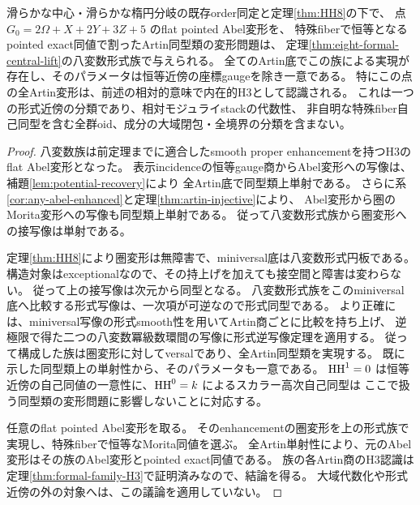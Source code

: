 \begin{theorem}\label{thm:intrinsic-formal-eight}
滑らかな中心・滑らかな楕円分岐の既存order同定と定理\ref{thm:HH8}の下で、
点 $G_0=2\Omega+X+2Y+3Z+5$ のflat pointed Abel変形を、
特殊fiberで恒等となるpointed exact同値で割ったArtin同型類の変形問題は、
定理\ref{thm:eight-formal-central-lift}の八変数形式族で与えられる。
全てのArtin底でこの族による実現が存在し、そのパラメータは恒等近傍の座標gaugeを除き一意である。
特にこの点の全Artin変形は、前述の相対的意味で内在的H3として認識される。
これは一つの形式近傍の分類であり、相対モジュライstackの代数性、
非自明な特殊fiber自己同型を含む全群oid、成分の大域閉包・全境界の分類を含まない。
\end{theorem}
\begin{proof}
八変数族は前定理までに適合したsmooth proper enhancementを持つH3のflat Abel変形となった。
表示incidenceの恒等gauge商からAbel変形への写像は、補題\ref{lem:potential-recovery}により
全Artin底で同型類上単射である。
さらに系\ref{cor:any-abel-enhanced}と定理\ref{thm:artin-injective}により、
Abel変形から圏のMorita変形への写像も同型類上単射である。
従って八変数形式族から圏変形への接写像は単射である。

定理\ref{thm:HH8}により圏変形は無障害で、miniversal底は八変数形式円板である。
構造対象はexceptionalなので、その持上げを加えても接空間と障害は変わらない。
従って上の接写像は次元から同型となる。
八変数形式族をこのminiversal底へ比較する形式写像は、一次項が可逆なので形式同型である。
より正確には、miniversal写像の形式smooth性を用いてArtin商ごとに比較を持ち上げ、
逆極限で得た二つの八変数冪級数環間の写像に形式逆写像定理を適用する。
従って構成した族は圏変形に対してversalであり、全Artin同型類を実現する。
既に示した同型類上の単射性から、そのパラメータも一意である。
$\operatorname{HH}^1=0$ は恒等近傍の自己同値の一意性に、$\operatorname{HH}^0=k$ によるスカラー高次自己同型は
ここで扱う同型類の変形問題に影響しないことに対応する。

任意のflat pointed Abel変形を取る。
そのenhancementの圏変形を上の形式族で実現し、特殊fiberで恒等なMorita同値を選ぶ。
全Artin単射性により、元のAbel変形はその族のAbel変形とpointed exact同値である。
族の各Artin商のH3認識は定理\ref{thm:formal-family-H3}で証明済みなので、結論を得る。
大域代数化や形式近傍の外の対象へは、この議論を適用していない。
\end{proof}
